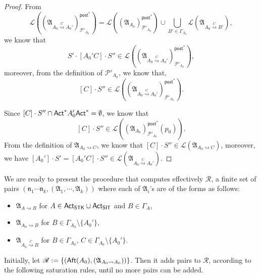 \documentclass[preprint,12pt]{elsarticle}
\newcommand\Pp{{\mathcal{P} }}
\newcommand\act{{\sf Act}}
\newcommand\aft{{\sf Aft}}
\newcommand\post{{\mathsf{post} }}
\newcommand\aname{\mathfrak{n}}
\newcommand\AutReach{\mathscr{R}}
\newcommand\init{{\sf Init}}
\newcommand{\STK}{\mathsf{STK}}
\newcommand{\SIT}{\mathsf{SIT}}
\newcommand\Aut{{\mathfrak{A} }}
\newcommand\Lang{{\mathscr{L} }}
\begin{document}
{\begin{proof}
    From $$\Lang((\Aut_{A_0\stackrel{C}\rightsquigarrow A_0'})^{\post^*}_{\Pp'_{A_0}}) = \Lang((\Aut_{A_0})^{\post^*}_{\Pp'_{A_0}})\cup\bigcup\limits_{B'\in\Gamma_{A_0}}\Lang(\Aut_{A_0\stackrel{C}\rightsquigarrow B'}),$$
    we know that
    $$S'\cdot[A_0'C]\cdot S''\in \Lang((\Aut_{A_0\stackrel{C}\rightsquigarrow A_0'})^{\post^*}_{\Pp'_{A_0}}),$$
    moreover, from the definition of $\Pp'_{A_0}$, we know that,
    $$[C]\cdot S''\in \Lang((\Aut_{A_0\stackrel{C}\rightsquigarrow A_0'})^{\post^*}_{\Pp'_{A_0}}).$$

    Since $[C]\cdot S''\cap \act^*A_0'\act^* = \emptyset$, we know that $$[C]\cdot S''\in \Lang((\Aut_{A_0})^{\post^*}_{\Pp'_{A_0}}(p_0)).$$
    From the definition of $\Aut_{A_0\rightsquigarrow C}$, we know that $[C]\cdot S''\in \Lang(\Aut_{A_0\rightsquigarrow C})$,
    moreover, we have $[A_0']\cdot S' = [A_0'C]\cdot S''\in \Lang(\Aut_{A_0\stackrel{C}\rightsquigarrow A_0'})$.
\end{proof}
}

We are ready to present the procedure that computes effectively $\AutReach$, a finite set of pairs $(\aname_1\cdots\aname_k,(\Aut_1,\cdots,\Aut_k))$ where each of $\Aut_i$'s are of the forms as follows:
\begin{itemize}
    \item $\Aut_{A\rightsquigarrow B}$ for $A\in\act_{\STK}\cup\act_{\SIT}$ and $B\in\Gamma_A$,
    \item $\Aut_{A_0\rightsquigarrow B}$ for $B\in\Gamma_{A_0}\setminus\{A_0'\}$,
    \item $\Aut_{A_0\stackrel{C}\rightsquigarrow B}$ for $B\in\Gamma_{A_0}$, $C\in\Gamma_{A_0}\setminus\{A_0'\}$.
\end{itemize}
Initially, let $\AutReach := \{(\aft(A_0),(\Aut_{A_0\rightsquigarrow A_0}))\}$.
Then it adds pairs to $\AutReach$, according to the following saturation rules, until no more pairs can be added.
\end{document}
